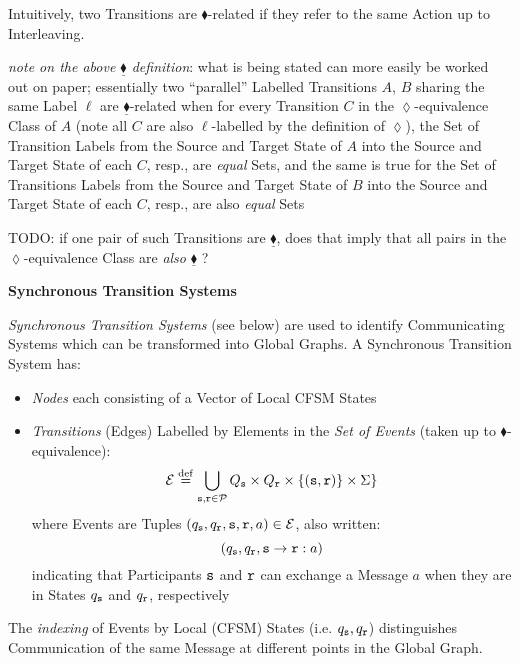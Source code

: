 Intuitively, two Transitions are $\blacklozenge$-related if they refer
to the same Action up to Interleaving.

\emph{note on the above $\underline{\blacklozenge}$ definition}: what
is being stated can more easily be worked out on paper; essentially
two ``parallel'' Labelled Transitions $A$, $B$ sharing the same Label
$\ell$ are $\underline{\blacklozenge}$-related when for every
Transition $C$ in the $\lozenge$-equivalence Class of $A$ (note all
$C$ are also $\ell$-labelled by the definition of $\lozenge$), the Set
of Transition Labels from the Source and Target State of $A$ into the
Source and Target State of each $C$, resp., are \emph{equal} Sets, and
the same is true for the Set of Transitions Labels from the Source and
Target State of $B$ into the Source and Target State of each $C$,
resp., are also \emph{equal} Sets

TODO: if one pair of such Transitions are $\underline{\blacklozenge}$,
does that imply that all pairs in the $\lozenge$-equivalence Class are
\emph{also} $\underline{\blacklozenge}$ ?



\textbf{Synchronous Transition Systems}

\emph{Synchronous Transition Systems} (see below) are used to identify
Communicating Systems which can be transformed into Global Graphs. A
Synchronous Transition System has:
\begin{itemize}
\item \emph{Nodes} each consisting of a Vector of Local CFSM States
\item \emph{Transitions} (Edges) Labelled by Elements in the \emph{Set
  of Events} (taken up to $\blacklozenge$-equivalence):
\[
  \mathcal{E} \stackrel{\mathrm{def}}= \bigcup_{\mathtt{s,r\in\mathcal{P}}} Q_\mathtt{s} \times
    Q_\mathtt{r} \times \{(\mathtt{s,r})\} \times \Sigma \}
\]
where Events are Tuples
$(q_\mathtt{s},q_\mathtt{r},\mathtt{s},\mathtt{r},a) \in \mathcal{E}$, also
written:
\[
  (q_\mathtt{s},q_\mathtt{r},\mathtt{s}\rightarrow\mathtt{r}:a)
\]
indicating that Participants $\mathtt{s}$ and $\mathtt{r}$ can exchange
a Message $a$ when they are in States $q_\mathtt{s}$ and $q_\mathtt{r}$,
respectively
\end{itemize}

The \emph{indexing} of Events by Local (CFSM) States (i.e.
$q_\mathtt{s}, q_\mathtt{r}$) distinguishes Communication of the same
Message at different points in the Global Graph.



